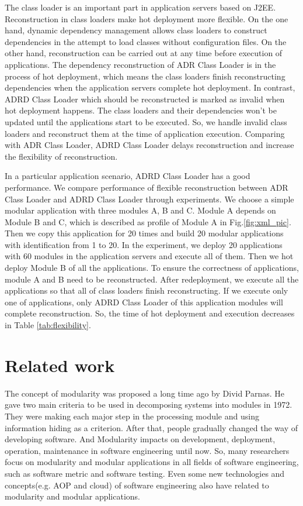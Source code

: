 \documentclass[conference]{IEEEtran}
\begin{document}
The class loader is an important part in application servers based on J2EE.
Reconstruction in class loaders make hot deployment more flexible.
On the one hand, dynamic dependency management allows class loaders to construct dependencies in the attempt to load classes without configuration files.
On the other hand, reconstruction can be carried out at any time before execution of applications.
The dependency reconstruction of ADR Class Loader is in the process of hot deployment, which means the class loaders finish reconstructing dependencies when the application servers complete hot deployment.
In contrast, ADRD Class Loader which should be reconstructed is marked as invalid when hot deployment happens.
The class loaders and their dependencies won't be updated until the applications start to be executed.
So, we handle invalid class loaders and reconstruct them at the time of application execution.
Comparing with ADR Class Loader, ADRD Class Loader delays reconstruction and increase the flexibility of reconstruction.

In a particular application scenario, ADRD Class Loader has a good performance. 
We compare performance of flexible reconstruction between ADR Class Loader and ADRD Class Loader through experiments.
We choose a simple modular application with three modules A, B and C.
Module A depends on Module B and C, which is described as profile of Module A in Fig.\ref{fig:xml_pic}.
Then we copy this application for 20 times and build 20 modular applications with identification from 1 to 20.
In the experiment, we deploy 20 applications with 60 modules in the application servers and execute all of them.
Then we hot deploy Module B of all the applications.
To ensure the correctness of applications, module A and B need to be reconstructed.
After redeployment, we execute all the applications so that all of class loaders finish reconstructing.
If we execute only one of applications, only ADRD Class Loader of this application modules will complete reconstruction.
So, the time of hot deployment and execution decreases in Table \ref{tab:flexibility}. 



\section{Related work\label{sec:relatedwork}}

The concept of modularity was proposed a long time ago by Divid Parnas\cite{Divid_specification}.
He gave two main criteria\cite{Divid_criteria} to be used in decomposing systems into modules in 1972.
They were making each major step in the processing module and using information hiding as a criterion.
After that, people gradually changed the way of developing software.
And Modularity impacts on development, deployment, operation, maintenance in software engineering until now.
So, many researchers focus on modularity and modular applications in all fields of software engineering, such as software metric\cite{module_metric} and software testing\cite{module_test}.
Even some new technologies and concepts(e.g. AOP\cite{module_aop} and cloud\cite{module_cloud}) of software engineering also have related to modularity and modular applications.
\end{document}
